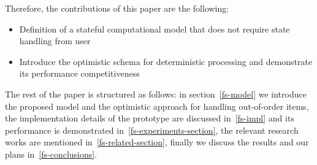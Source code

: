 Therefore, the contributions of this paper are the following:

\begin {itemize}
\item Definition of a stateful computational model that does not require state handling from user
\item Introduce the optimistic schema for deterministic processing and demonstrate its performance competitiveness
\end {itemize}

The rest of the paper is structured as follows: in section~\ref{fs-model} we introduce the proposed model and the optimistic approach for handling out-of-order items, the implementation details of the prototype are discussed in~\ref{fs-impl} and its performance is demonstrated in~\ref{fs-experiments-section}, the relevant research works are mentioned in~\ref{fs-related-section}, finally we discuss the results and our plans in~\ref{fs-conclusions}.

\endinput
